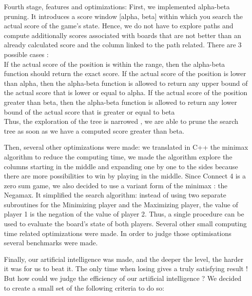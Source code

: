 \documentclass[12pt, a4paper, oneside]{report}
\begin{document}
Fourth stage, features and optimizations:
	First, we implemented alpha-beta pruning. It introduces a score window [alpha, beta] within which you search the actual score of the game’s state. Hence, we do not have to explore paths and compute  additionally scores associated with boards that are not better than an already calculated score and the column linked to the path related. There are 3 possible cases :  \\

	\hspace*{1cm} If the actual score of the position is within the range, then the alpha-beta function should return the exact score.
	\hspace*{1cm} If the actual score of the position is lower than alpha, then the alpha-beta function is allowed to return any upper bound of the actual score that is lower or equal to alpha.
	\hspace*{1cm} If the actual score of the position greater than beta, then the alpha-beta function is allowed to return any lower bound of the actual score that is greater or equal to beta \\

Thus, the exploration of the tree is narrowed , we are able to prune the search tree as soon as we have a computed score greater than beta.

	Then, several other optimizations were made: we translated in C++ the minimax algorithm to reduce the computing time, we made the algorithm explore the columns starting in the middle and expanding one by one to the sides because there are more possibilities to win by playing in the middle. 
	Since Connect 4 is a zero sum game, we also decided to use a variant form of the minimax : the Negamax. It simplified the search algorithm: instead of using two separate subroutines for the Minimizing player and the Maximizing player, the value of player 1 is the negation of the value of player 2. Thus, a single procedure can be used to evaluate the board’s state of both players.
	Several other small computing time related optimizations were made. In order to judge those optimisations several benchmarks were made.


Finally, our artificial intelligence was made, and the deeper the level, the harder it was for us to beat it. The only time when losing gives a truly satisfying result ! But how could we judge the efficiency of our artificial intelligence ? We decided to create a small set of the following criteria to do so: \\
\end{document}
